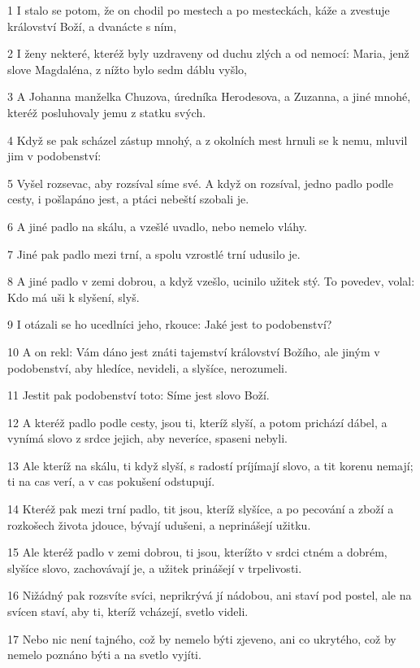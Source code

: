 \par 1 I stalo se potom, že on chodil po mestech a po mesteckách, káže a zvestuje království Boží, a dvanácte s ním,
\par 2 I ženy nekteré, kteréž byly uzdraveny od duchu zlých a od nemocí: Maria, jenž slove Magdaléna, z nížto bylo sedm dáblu vyšlo,
\par 3 A Johanna manželka Chuzova, úredníka Herodesova, a Zuzanna, a jiné mnohé, kteréž posluhovaly jemu z statku svých.
\par 4 Když se pak scházel zástup mnohý, a z okolních mest hrnuli se k nemu, mluvil jim v podobenství:
\par 5 Vyšel rozsevac, aby rozsíval síme své. A když on rozsíval, jedno padlo podle cesty, i pošlapáno jest, a ptáci nebeští szobali je.
\par 6 A jiné padlo na skálu, a vzešlé uvadlo, nebo nemelo vláhy.
\par 7 Jiné pak padlo mezi trní, a spolu vzrostlé trní udusilo je.
\par 8 A jiné padlo v zemi dobrou, a když vzešlo, ucinilo užitek stý. To povedev, volal: Kdo má uši k slyšení, slyš.
\par 9 I otázali se ho ucedlníci jeho, rkouce: Jaké jest to podobenství?
\par 10 A on rekl: Vám dáno jest znáti tajemství království Božího, ale jiným v podobenství, aby hledíce, nevideli, a slyšíce, nerozumeli.
\par 11 Jestit pak podobenství toto: Síme jest slovo Boží.
\par 12 A kteréž padlo podle cesty, jsou ti, kteríž slyší, a potom prichází dábel, a vynímá slovo z srdce jejich, aby neveríce, spaseni nebyli.
\par 13 Ale kteríž na skálu, ti když slyší, s radostí príjímají slovo, a tit korenu nemají; ti na cas verí, a v cas pokušení odstupují.
\par 14 Kteréž pak mezi trní padlo, tit jsou, kteríž slyšíce, a po pecování a zboží a rozkošech života jdouce, bývají udušeni, a neprinášejí užitku.
\par 15 Ale kteréž padlo v zemi dobrou, ti jsou, kterížto v srdci ctném a dobrém, slyšíce slovo, zachovávají je, a užitek prinášejí v trpelivosti.
\par 16 Nižádný pak rozsvíte svíci, neprikrývá jí nádobou, ani staví pod postel, ale na svícen staví, aby ti, kteríž vcházejí, svetlo videli.
\par 17 Nebo nic není tajného, což by nemelo býti zjeveno, ani co ukrytého, což by nemelo poznáno býti a na svetlo vyjíti.
